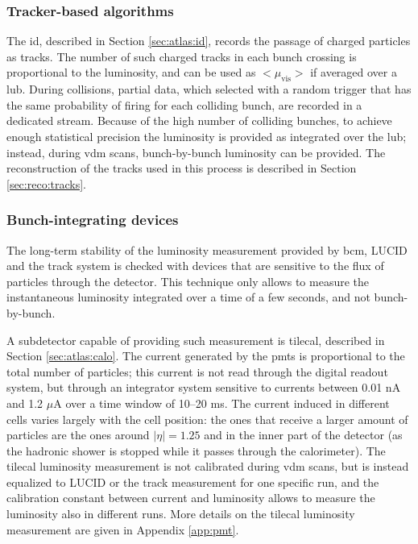 
\subsubsection*{Tracker-based algorithms}

The \gls{id}, described in Section \ref{sec:atlas:id}, records the passage of charged particles as tracks. The number of such charged tracks in each bunch crossing is proportional to the luminosity, and can be used as ${<}\mu_\mathrm{vis}{>}$ if averaged over a \gls{lub}. 
During collisions, partial data, which selected with a random trigger that has the same probability of firing for each colliding bunch, 
are recorded in a dedicated stream. Because of the high number of colliding bunches, to achieve enough statistical precision the luminosity is provided as integrated over the \gls{lub}; instead, during \gls{vdm} scans, bunch-by-bunch luminosity can be provided. 
The reconstruction of the tracks used in this process is described in Section \ref{sec:reco:tracks}.

\subsubsection*{Bunch-integrating devices}

The long-term stability of the luminosity measurement provided by \gls{bcm}, LUCID and the track system is checked with devices that are sensitive to the flux of particles through the detector. This technique only allows to measure the instantaneous luminosity integrated over a time of a few seconds, and not bunch-by-bunch.

A subdetector capable of providing such measurement is \gls{tilecal}, described in Section \ref{sec:atlas:calo}. The current generated by the \glspl{pmt} is proportional to the total number of particles; this current is not read through the digital readout system, but through an integrator system sensitive to currents between 0.01 nA and 1.2 $\mu$A over a time window of 10--20 ms. The current induced in different cells varies largely with the cell position: the ones that receive a larger amount of particles are the ones around $|\eta|=1.25$ and in the inner part of the detector (as the hadronic shower is stopped while it passes through the calorimeter). The \gls{tilecal} luminosity measurement is not calibrated during \gls{vdm} scans, but is instead equalized to LUCID or the track measurement for one specific run, and the calibration constant between current and luminosity allows to measure the luminosity also in different runs. More details on the \gls{tilecal} luminosity measurement are given in 
Appendix \ref{app:pmt}. 

